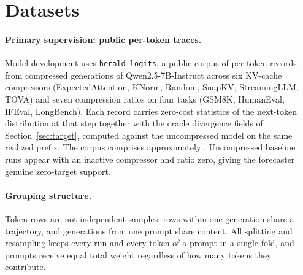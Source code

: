 \section{Datasets}

\label{sec:dataset}

\paragraph{Primary supervision: public per-token traces.}
Model development uses \texttt{herald-logits}, a public corpus of per-token
records from compressed generations of Qwen2.5-7B-Instruct across six
KV-cache compressors (ExpectedAttention, KNorm, Random, SnapKV, StreamingLLM,
TOVA) and seven compression ratios on four tasks (GSM8K, HumanEval, IFEval,
LongBench). Each record carries
zero-cost statistics of the next-token distribution at that step together
with the oracle divergence fields of Section~\ref{sec:target}, computed
against the uncompressed model on the same realized prefix. The corpus
comprises approximately . Uncompressed baseline runs appear with an inactive
compressor and ratio zero, giving the forecaster genuine zero-target support.

\paragraph{Grouping structure.}
Token rows are not independent samples: rows within one generation share a
trajectory, and generations from one prompt share content. All splitting and
resampling keeps every run and every token of a prompt in a single fold, and
prompts receive equal total weight regardless of how many tokens they
contribute.

